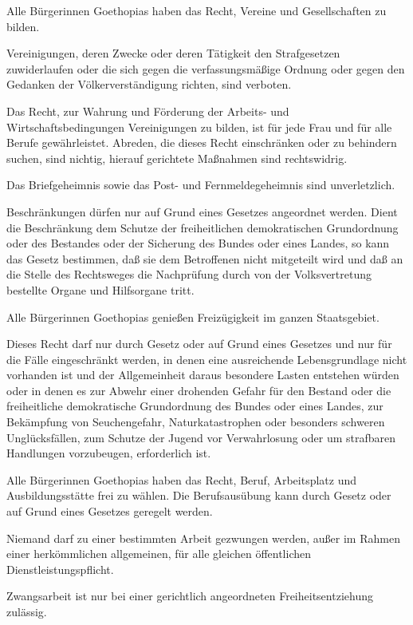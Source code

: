 \documentclass{sasbase}
\begin{document}
\begin{article}[Vereinsfreiheit]
	\item Alle B\"{u}rgerinnen Goethopias haben das Recht, Vereine und Gesellschaften zu bilden.
	\item Vereinigungen, deren Zwecke oder deren Tätigkeit den Strafgesetzen zuwiderlaufen oder die sich gegen die verfassungsmäßige Ordnung oder gegen den Gedanken der Völkerverständigung richten, sind verboten.
	\item Das Recht, zur Wahrung und Förderung der Arbeits- und Wirtschaftsbedingungen Vereinigungen zu bilden, ist für jede Frau und für alle Berufe gewährleistet. Abreden, die dieses Recht einschränken oder zu behindern suchen, sind nichtig, hierauf gerichtete Maßnahmen sind rechtswidrig.
\end{article}

\begin{article}[Briefgeheimnis]
	\item Das Briefgeheimnis sowie das Post- und Fernmeldegeheimnis sind unverletzlich.
	\item Beschränkungen dürfen nur auf Grund eines Gesetzes angeordnet werden. Dient die Beschränkung dem Schutze der freiheitlichen demokratischen Grundordnung oder des Bestandes oder der Sicherung des Bundes oder eines Landes, so kann das Gesetz bestimmen, daß sie dem Betroffenen nicht mitgeteilt wird und daß an die Stelle des Rechtsweges die Nachprüfung durch von der Volksvertretung bestellte Organe und Hilfsorgane tritt.
\end{article}

\begin{article}
	\item Alle B\"{u}rgerinnen Goethopias genießen Freizügigkeit im ganzen Staatsgebiet.
	\item Dieses Recht darf nur durch Gesetz oder auf Grund eines Gesetzes und nur für die Fälle eingeschränkt werden, in denen eine ausreichende Lebensgrundlage nicht vorhanden ist und der Allgemeinheit daraus besondere Lasten entstehen würden oder in denen es zur Abwehr einer drohenden Gefahr für den Bestand oder die freiheitliche demokratische Grundordnung des Bundes oder eines Landes, zur Bekämpfung von Seuchengefahr, Naturkatastrophen oder besonders schweren Unglücksfällen, zum Schutze der Jugend vor Verwahrlosung oder um strafbaren Handlungen vorzubeugen, erforderlich ist.
\end{article}

\begin{article}
	\item Alle B\"{u}rgerinnen Goethopias haben das Recht, Beruf, Arbeitsplatz und Ausbildungsstätte frei zu wählen. Die Berufsausübung kann durch Gesetz oder auf Grund eines Gesetzes geregelt werden.	
	\item Niemand darf zu einer bestimmten Arbeit gezwungen werden, außer im Rahmen einer herkömmlichen allgemeinen, für alle gleichen öffentlichen Dienstleistungspflicht.
	\item Zwangsarbeit ist nur bei einer gerichtlich angeordneten Freiheitsentziehung zulässig.
\end{article}
\end{document}
